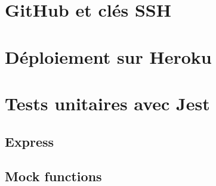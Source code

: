 \documentclass[a4paper,10pt]{article}
\begin{document}
\section{GitHub et clés SSH}
\section{Déploiement sur Heroku}
\section{Tests unitaires avec Jest}
\subsection{Express}
\subsection{Mock functions}
\end{document}
